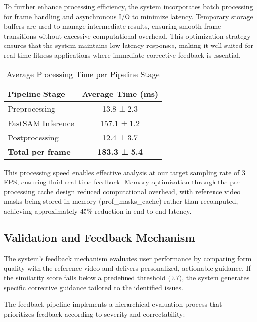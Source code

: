 \documentclass[conference]{IEEEtran}
\begin{document}
To further enhance processing efficiency, the system incorporates batch processing for frame handling and asynchronous I/O to minimize latency. Temporary storage buffers are used to manage intermediate results, ensuring smooth frame transitions without excessive computational overhead. This optimization strategy ensures that the system maintains low-latency responses, making it well-suited for real-time fitness applications where immediate corrective feedback is essential.

\begin{table}[h]
\caption{Average Processing Time per Pipeline Stage}
\centering
\begin{tabular}{|l|c|}
\hline
\textbf{Pipeline Stage} & \textbf{Average Time (ms)} \\
\hline
Preprocessing & 13.8 ± 2.3 \\
\hline
FastSAM Inference & 157.1 ± 1.2 \\
\hline
Postprocessing & 12.4 ± 3.7 \\
\hline
\textbf{Total per frame} & \textbf{183.3 ± 5.4} \\
\hline
\end{tabular}
\end{table}

This processing speed enables effective analysis at our target sampling rate of 3 FPS, ensuring fluid real-time feedback. Memory optimization through the pre-processing cache design reduced computational overhead, with reference video masks being stored in memory (prof\_masks\_cache) rather than recomputed, achieving approximately 45\% reduction in end-to-end latency.
\subsection{Validation and Feedback Mechanism}
The system's feedback mechanism evaluates user performance by comparing form quality with the reference video and delivers personalized, actionable guidance. If the similarity score falls below a predefined threshold (0.7), the system generates specific corrective guidance tailored to the identified issues.

The feedback pipeline implements a hierarchical evaluation process that prioritizes feedback according to severity and correctability:
\end{document}
